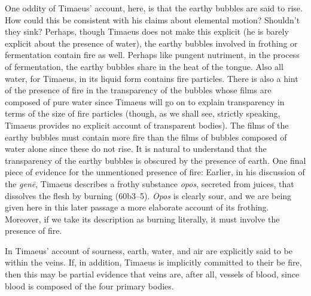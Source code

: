 One oddity of Timaeus' account, here, is that the earthy bubbles are said to rise. How could this be consistent with his claims about elemental motion? Shouldn't they sink? Perhaps, though Timaeus does not make this explicit (he is barely explicit about the presence of water), the earthy bubbles involved in frothing or fermentation contain fire as well. Perhaps like pungent nutriment, in the process of fermentation, the earthy bubbles share in the heat of the tongue. Also all water, for Timaeus, in its liquid form contains fire particles. There is also a hint of the presence of fire in the transparency of the bubbles whose films are composed of pure water since Timaeus will go on to explain transparency in terms of the size of fire particles (though, as we shall see, strictly speaking, Timaeus provides no explicit account of transparent bodies). The films of the earthy bubbles must contain more fire than the films of bubbles composed of water alone since these do not rise. It is natural to understand that the transparency of the earthy bubbles is obscured by the presence of earth. One final piece of evidence for the unmentioned presence of fire: Earlier, in his discussion of the \emph{genē}, Timaeus describes a frothy substance \emph{opos}, secreted from juices, that dissolves the flesh by burning (60b3--5). \emph{Opos} is clearly sour, and we are being given here in this later passage a more elaborate account of its frothing. Moreover, if we take its description as burning literally, it must involve the presence of fire.

In Timaeus' account of sourness, earth, water, and air are explicitly said to be within the veins. If, in addition, Timaeus is implicitly committed to their be fire, then this may be partial evidence that veins are, after all, vessels of blood, since blood is composed of the four primary bodies.


